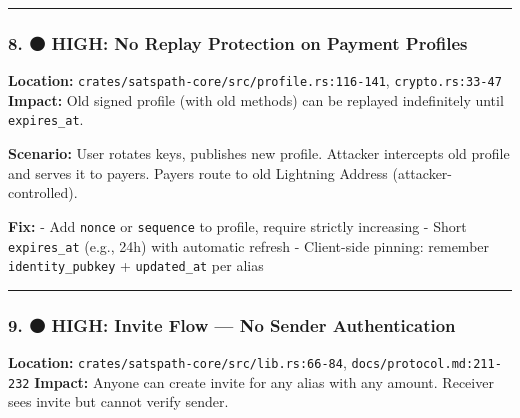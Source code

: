 \documentclass[
]{article}
\begin{document}
\begin{center}\rule{0.5\linewidth}{0.5pt}\end{center}

\hypertarget{high-no-replay-protection-on-payment-profiles}{%
\subsubsection{8. 🟠 HIGH: No Replay Protection on Payment
Profiles}\label{high-no-replay-protection-on-payment-profiles}}

\textbf{Location:} \texttt{crates/satspath-core/src/profile.rs:116-141},
\texttt{crypto.rs:33-47} \textbf{Impact:} Old signed profile (with old
methods) can be replayed indefinitely until \texttt{expires\_at}.

\textbf{Scenario:} User rotates keys, publishes new profile. Attacker
intercepts old profile and serves it to payers. Payers route to old
Lightning Address (attacker-controlled).

\textbf{Fix:} - Add \texttt{nonce} or \texttt{sequence} to profile,
require strictly increasing - Short \texttt{expires\_at} (e.g., 24h)
with automatic refresh - Client-side pinning: remember
\texttt{identity\_pubkey} + \texttt{updated\_at} per alias

\begin{center}\rule{0.5\linewidth}{0.5pt}\end{center}

\hypertarget{high-invite-flow-no-sender-authentication}{%
\subsubsection{9. 🟠 HIGH: Invite Flow --- No Sender
Authentication}\label{high-invite-flow-no-sender-authentication}}

\textbf{Location:} \texttt{crates/satspath-core/src/lib.rs:66-84},
\texttt{docs/protocol.md:211-232} \textbf{Impact:} Anyone can create
invite for any alias with any amount. Receiver sees invite but cannot
verify sender.
\end{document}

